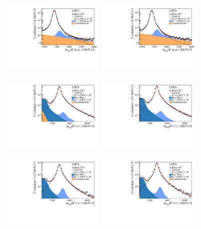 \begin{figure}
    \centering
    \includegraphics[width=0.45\textwidth]{figures/Fig7a.pdf}
    \includegraphics[width=0.45\textwidth]{figures/Fig7b.pdf}
    
    \includegraphics[width=0.45\textwidth]{figures/Fig7c.pdf}
    \includegraphics[width=0.45\textwidth]{figures/Fig7d.pdf}
    
    \includegraphics[width=0.45\textwidth]{figures/Fig7e.pdf}
    \includegraphics[width=0.45\textwidth]{figures/Fig7f.pdf}
    

\end{figure}
